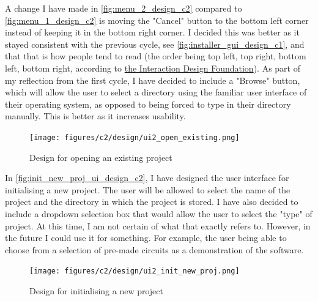 \documentclass[11pt]{article}
\begin{document}
                A change I have made in \autoref{fig:menu_2_design_c2} compared to \autoref{fig:menu_1_design_c2} is moving the "Cancel" button to the bottom left corner instead of keeping it in the bottom right corner. I decided this was better as it stayed consistent with the previous cycle, see \autoref{fig:installer_gui_design_c1}, and that that is how people tend to read (the order being top left, top right, bottom left, bottom right, according to \href{https://www.interaction-design.org/literature/article/visual-hierarchy-organizing-content-to-follow-natural-eye-movement-patterns}{the Interaction Design Foundation}). As part of my reflection from the first cycle, I have decided to include a "Browse" button, which will allow the user to select a directory using the familiar user interface of their operating system, as opposed to being forced to type in their directory manually. This is better as it increases usability. 

                \begin{figure}[!ht]
                    \centering
                    \texttt{[image: figures/c2/design/ui2\_open\_existing.png]}
                    \caption{Design for opening an existing project}
                    \label{fig:menu_2_design_c2}
                \end{figure}

                In \autoref{fig:init_new_proj_ui_design_c2}, I have designed the user interface for initialising a new project. The user will be allowed to select the name of the project and the directory in which the project is stored. I have also decided to include a dropdown selection box that would allow the user to select the "type" of project. At this time, I am not certain of what that exactly refers to. However, in the future I could use it for something. For example, the user being able to choose from a selection of pre-made circuits as a demonstration of the software.

                \begin{figure}[!ht]
                    \centering
                    \texttt{[image: figures/c2/design/ui2\_init\_new\_proj.png]}
                    \caption{Design for initialising a new project}
                    \label{fig:init_new_proj_ui_design_c2}
                \end{figure}
\end{document}
